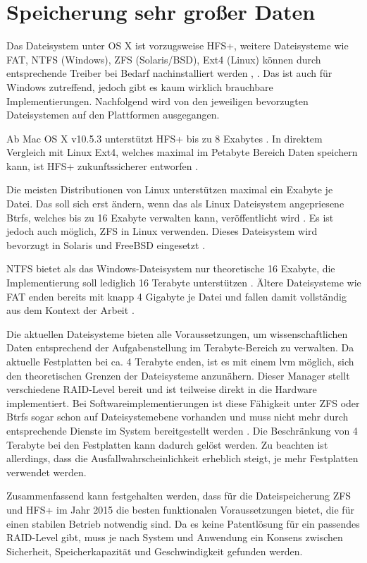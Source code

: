 \documentclass[oneside, ngerman, toc=bibliography,bibliography=totoc,listof=entryprefix, open=right,numbers=noenddot,fontsize=12pt]{scrbook}
\begin{document}
  

\section{Speicherung sehr großer Daten}
Das Dateisystem unter OS X ist vorzugsweise {HFS+}, weitere Dateisysteme wie {FAT}, { NTFS} (Windows), {ZFS} (Solaris/BSD), {Ext4} (Linux) können durch entsprechende Treiber bei Bedarf nachinstalliert werden \cite{winext}, \cite{macntfs}. Das ist auch für Windows zutreffend, jedoch gibt es kaum wirklich brauchbare Implementierungen.
Nachfolgend wird von den jeweiligen bevorzugten Dateisystemen auf den Plattformen ausgegangen.

Ab Mac OS X v10.5.3 unterstützt  {HFS+} bis zu 8 Exabytes \cite{maclimit}. In direktem Vergleich mit Linux Ext4, welches maximal im Petabyte Bereich Daten speichern kann, ist HFS+ zukunftssicherer entworfen \cite{kernelwiki}.

Die meisten Distributionen von Linux unterstützen maximal ein Exabyte je Datei. Das soll sich erst ändern, wenn das als Linux Dateisystem angepriesene {Btrfs}, welches bis zu 16 Exabyte verwalten kann, veröffentlicht wird \cite{btrfs}. Es ist jedoch auch möglich, ZFS in Linux verwenden. Dieses Dateisystem  wird bevorzugt in Solaris und FreeBSD eingesetzt \cite{zfslinux}.

NTFS bietet als das Windows-Dateisystem nur theoretische 16 Exabyte, die Implementierung soll lediglich 16 Terabyte unterstützen \cite{ntfslimit}. Ältere Dateisysteme wie {FAT} enden bereits mit knapp 4 Gigabyte je Datei und fallen damit vollständig aus dem Kontext der Arbeit \cite{fatlimit}.
 
Die aktuellen Dateisysteme bieten alle Voraussetzungen, um wissenschaftlichen Daten entsprechend der Aufgabenstellung im Terabyte-Bereich zu verwalten. Da aktuelle Festplatten bei ca. 4 Terabyte enden, ist es mit einem \acrfull{lvm} möglich, sich den theoretischen Grenzen der Dateisysteme anzunähern. Dieser Manager stellt verschiedene RAID-Level bereit und ist teilweise direkt in die Hardware implementiert. Bei Softwareimplementierungen ist diese Fähigkeit unter {ZFS} oder {Btrfs} sogar schon auf Dateisystemebene vorhanden und muss nicht mehr durch entsprechende Dienste im System bereitgestellt werden \cite{zfsraid}.
Die Beschränkung von 4 Terabyte bei den Festplatten kann dadurch gelöst werden.
Zu beachten ist allerdings, dass die Ausfallwahrscheinlichkeit erheblich steigt, je mehr Festplatten verwendet werden.

Zusammenfassend kann festgehalten werden, dass für die Dateispeicherung {ZFS} und {HFS+} im Jahr 2015 die besten funktionalen Voraussetzungen bietet, die für einen stabilen Betrieb notwendig sind. Da es keine Patentlösung für ein passendes RAID-Level gibt, muss je nach System und Anwendung ein Konsens zwischen Sicherheit, Speicherkapazität und Geschwindigkeit gefunden werden.
\end{document}
